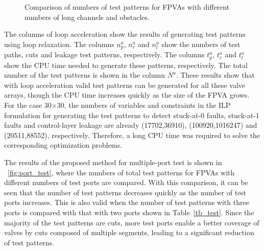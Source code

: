 \begin{figure}[t]
{\figurefontsize
\centering
\vskip 10pt
%
\caption{Comparison of numbers of test patterns for 
FPVAs with different numbers of long channels and obstacles.}
\label{fig:wall_hole_test}
}
\end{figure}




The columns of loop acceleration show the results of generating test patterns using
loop relaxation. The columns $n^a_p$, $n^a_c$ and $n^a_l$ show the
numbers of test paths, cuts and leakage test patterns,
respectively.
The columns $t^a_p$, $t^a_c$ and $t^a_l$
show the CPU time needed to generate these patterns, respectively. The total number
of the test patterns is
shown in the column $N^a$. These results show that with loop acceleration 
valid test patterns can be generated for all these valve arrays, though the CPU
time increases quickly as the size of the FPVA grows.
For the case 30$\times$30, 
the numbers of variables and constraints 
in the ILP formulation
for generating the test patterns to detect stuck-at-0 faults, 
stuck-at-1 faults and control-layer leakage are already (17702,36910), 
(100920,1016247) and (20511,88552), respectively. 
Therefore, a long CPU time
was required to solve the corresponding optimization problems.

The results of the proposed method for multiple-port test is shown in
\figname~\ref{fig:port_test}, where 
the numbers of total test patterns for FPVAs with different numbers of test ports
are compared. 
With this comparison, it can be seen that the number of test
patterns decreases quickly as the number of test ports increases. 
This is also valid when the number of test patterns with three ports is compared
with that with two ports shown in Table~\ref{tb_test}.
Since the majority of the test patterns are cuts,
more test ports enable a better coverage of valves by cuts composed of multiple
segments,
leading to a significant reduction of test patterns.

